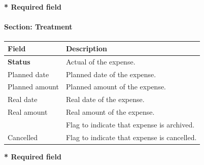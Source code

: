\documentclass[letterpaper,10pt,english]{sphinxmanual}
\begin{document}
\textbf{* Required field}
\paragraph{Section: Treatment}

\begin{tabulary}{\linewidth}{|l|l|}
\hline
\textsf{\relax 
Field
} & \textsf{\relax 
Description
}\\
\hline
\textbf{Status}
 & 
Actual {\hyperref[Glossary:term-status]{\emph{}}} of the expense.
\\
\hline
Planned date
 & 
Planned date of the expense.
\\
\hline
Planned amount
 & 
Planned amount of the expense.
\\
\hline
Real date
 & 
Real date of the expense.
\\
\hline
Real amount
 & 
Real amount of the expense.
\\
\hline
{\hyperref[Glossary:term-closed]{\emph{}}}
 & 
Flag to indicate that expense is archived.
\\
\hline
Cancelled
 & 
Flag to indicate that expense is cancelled.
\\
\hline\end{tabulary}


\textbf{* Required field}
\end{document}
